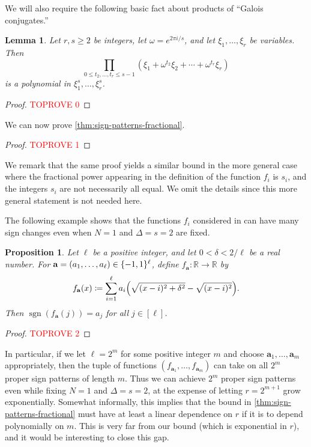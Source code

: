 \documentclass[11pt]{amsart}
\newtheorem{proposition}[theorem]{Proposition}
\newtheorem{lemma}[theorem]{Lemma}
\theoremstyle{definition}
\DeclarePairedDelimiter{\paren}{(}{)}
\DeclarePairedDelimiter{\set}{\{}{\}}
\DeclareMathOperator{\sgn}{sgn}
\let\Vec\mathbf
\newcommand{\RR}{\mathbb{R}}
\begin{document}
We will also require the following basic fact about products of ``Galois conjugates.''

\begin{lemma}\label{lem:galois}
Let $r,s \geq 2$ be integers, let $\omega=e^{2\pi i/s}$, and let $\xi_1,\ldots,\xi_r$ be variables.  Then
\[\prod_{0 \leq t_2,\ldots, t_r \leq s-1} (\xi_1+\omega^{t_2} \xi_2+\cdots+\omega^{t_r}\xi_r)\] is a polynomial in $\xi_1^s, \ldots, \xi_r^s$.
\end{lemma}

\begin{proof}\textcolor{red}{TOPROVE 0}\end{proof}

We can now prove \cref{thm:sign-patterns-fractional}.

\begin{proof}\textcolor{red}{TOPROVE 1}\end{proof}
We remark that the same proof yields a similar bound in the more general case where the fractional power appearing in the definition
of the function $f_i$ is $s_i$, and the integers $s_i$ are not necessarily all equal. We omit the details since this more general statement is not needed here.

The following example shows that the functions $f_i$ considered in  can have many sign changes even when $N=1$ and $\Delta=s=2$ are fixed.

\begin{proposition}
\label{prop:noga}
Let $\ell$ be a positive integer, and let $0<\delta<2/\ell$ be a real number.  For $\Vec a=(a_1, \ldots, a_\ell) \in \set{-1,1}^\ell$, define $f_{\Vec a}\colon\RR\to\RR$ by
\[
f_{\Vec a}(x)\coloneqq\sum_{i=1}^\ell a_i \paren*{\sqrt{(x-i)^2 +\delta^2} - \sqrt{(x-i)^2}}.
\]
Then $\sgn(f_{\Vec a}(j))=a_j$ for all $j\in[\ell]$. 
\end{proposition}

\begin{proof}\textcolor{red}{TOPROVE 2}\end{proof}
In particular, if we let $\ell = 2^m$ for some positive integer $m$ and choose $\Vec a_1,\ldots,\Vec a_m$ appropriately, then the tuple of functions $(f_{\Vec a_1},\ldots,f_{\Vec a_m})$ can take on all $2^m$ proper sign patterns of length $m$. Thus we can achieve $2^m$ proper sign patterns even while fixing $N = 1$ and $\Delta = s = 2$, at the expense of letting $r = 2^{m+1}$ grow exponentially. Somewhat informally, this implies that the bound in \cref{thm:sign-patterns-fractional} must have at least a linear dependence on $r$ if it is to depend polynomially on $m$. This is very far from our bound (which is exponential in $r$), and it would be interesting to close this gap.
\end{document}
